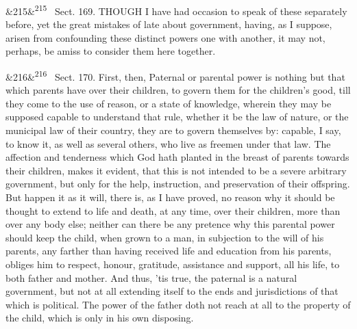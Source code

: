 \documentclass[12pt]{article}
\newcommand{\para}[1][]{\par\noindent\ifx&#1&\else\textsuperscript{\footnotesize #1}~\fi}
\begin{document}
\para[215] Sect. 169. THOUGH I have had occasion to speak of these separately before, yet the great mistakes of late about government, having, as I suppose, arisen from confounding these distinct powers one with another, it may not, perhaps, be amiss to consider them here together.

\para[216] Sect. 170. First, then, Paternal or parental power is nothing but that which parents have over their children, to govern them for the children's good, till they come to the use of reason, or a state of knowledge, wherein they may be supposed capable to understand that rule, whether it be the law of nature, or the municipal law of their country, they are to govern themselves by: capable, I say, to know it, as well as several others, who live as freemen under that law. The affection and tenderness which God hath planted in the breast of parents towards their children, makes it evident, that this is not intended to be a severe arbitrary government, but only for the help, instruction, and preservation of their offspring. But happen it as it will, there is, as I have proved, no reason why it should be thought to extend to life and death, at any time, over their children, more than over any body else; neither can there be any pretence why this parental power should keep the child, when grown to a man, in subjection to the will of his parents, any farther than having received life and education from his parents, obliges him to respect, honour, gratitude, assistance and support, all his life, to both father and mother. And thus, 'tis true, the paternal is a natural government, but not at all extending itself to the ends and jurisdictions of that which is political. The power of the father doth not reach at all to the property of the child, which is only in his own disposing.
\end{document}
